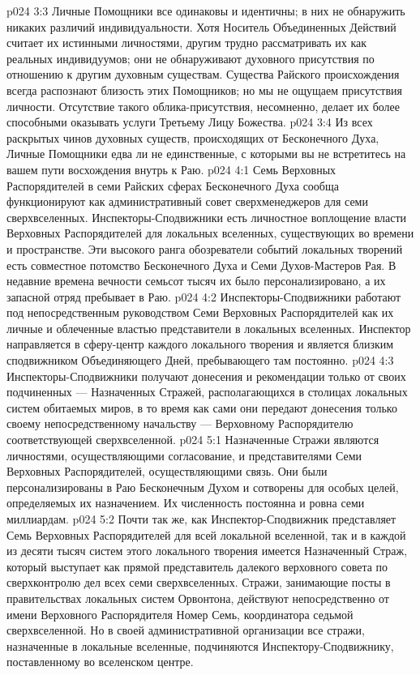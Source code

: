 \vs p024 3:3 Личные Помощники все одинаковы и идентичны; в них не обнаружить никаких различий индивидуальности. Хотя Носитель Объединенных Действий считает их истинными личностями, другим трудно рассматривать их как реальных индивидуумов; они не обнаруживают духовного присутствия по отношению к другим духовным существам. Существа Райского происхождения всегда распознают близость этих Помощников; но мы не ощущаем присутствия личности. Отсутствие такого облика\hyp{}присутствия, несомненно, делает их более способными оказывать услуги Третьему Лицу Божества.
\vs p024 3:4 Из всех раскрытых чинов духовных существ, происходящих от Бесконечного Духа, Личные Помощники едва ли не единственные, с которыми вы не встретитесь на вашем пути восхождения внутрь к Раю.
\vs p024 4:1 Семь Верховных Распорядителей в семи Райских сферах Бесконечного Духа сообща функционируют как административный совет сверхменеджеров для семи сверхвселенных. Инспекторы\hyp{}Сподвижники есть личностное воплощение власти Верховных Распорядителей для локальных вселенных, существующих во времени и пространстве. Эти высокого ранга обозреватели событий локальных творений есть совместное потомство Бесконечного Духа и Семи Духов\hyp{}Мастеров Рая. В недавние времена вечности семьсот тысяч их было персонализировано, а их запасной отряд пребывает в Раю.
\vs p024 4:2 Инспекторы\hyp{}Сподвижники работают под непосредственным руководством Семи Верховных Распорядителей как их личные и облеченные властью представители в локальных вселенных. Инспектор направляется в сферу\hyp{}центр каждого локального творения и является близким сподвижником Объединяющего Дней, пребывающего там постоянно.
\vs p024 4:3 Инспекторы\hyp{}Сподвижники получают донесения и рекомендации только от своих подчиненных --- Назначенных Стражей, располагающихся в столицах локальных систем обитаемых миров, в то время как сами они передают донесения только своему непосредственному начальству --- Верховному Распорядителю соответствующей сверхвселенной.
\vs p024 5:1 Назначенные Стражи являются личностями, осуществляющими согласование, и представителями Семи Верховных Распорядителей, осуществляющими связь. Они были персонализированы в Раю Бесконечным Духом и сотворены для особых целей, определяемых их назначением. Их численность постоянна и ровна семи миллиардам.
\vs p024 5:2 Почти так же, как Инспектор\hyp{}Сподвижник представляет Семь Верховных Распорядителей для всей локальной вселенной, так и в каждой из десяти тысяч систем этого локального творения имеется Назначенный Страж, который выступает как прямой представитель далекого верховного совета по сверхконтролю дел всех семи сверхвселенных. Стражи, занимающие посты в правительствах локальных систем Орвонтона, действуют непосредственно от имени Верховного Распорядителя Номер Семь, координатора седьмой сверхвселенной. Но в своей административной организации все стражи, назначенные в локальные вселенные, подчиняются Инспектору\hyp{}Сподвижнику, поставленному во вселенском центре.
